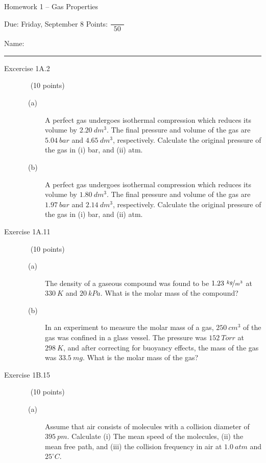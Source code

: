 \documentclass[12pt, openany, letterpaper]{memoir}
\begin{document}
\begin{center}
	{\large Homework 1 -- Gas Properties}
	
	Due: Friday, September 8 \hspace{3em} Points: ${\dfrac{~}{~~50~~}}$
\end{center}

Name: \rule[-.1mm]{15em}{0.1pt}

\begin{description}
	\item [Excercise 1A.2] ~ (10 points)
	\begin{description}
		\item [~(a)~~] A perfect gas undergoes isothermal compression which reduces its volume by $2.20~dm^3$. The final pressure and volume of the gas are $5.04~bar$ and $4.65~dm^3$, respectively. Calculate the original pressure of the gas in (i) bar, and (ii) atm.
		
		\vspace{6em}
		\item [~(b)~~] A perfect gas undergoes isothermal compression which reduces its volume by $1.80~dm^3$. The final pressure and volume of the gas are $1.97~bar$ and $2.14~dm^3$, respectively. Calculate the original pressure of the gas in (i) bar, and (ii) atm.
				
		\vspace{6em}
	\end{description} 
	\item [Exercise 1A.11] ~ (10 points)
	\begin{description}
		\item [~(a)~~] The density of a gaseous compound was found to be $1.23~\nicefrac{kg}{m^3}$ at $330~K$ and $20~kPa$. What is the molar mass of the compound?
		
		\vspace{9em}
		\item [~(b)~~] In an experiment to measure the molar mass of a gas, $250~cm^3$ of the gas was confined in a glass vessel. The pressure was $152~Torr$ at $298~K$, and after correcting for buoyancy effects, the mass of the gas was $33.5~mg$. What is the molar mass of the gas?
				
		\vspace{9em}
	\end{description} 
	\item [Exercise 1B.15] ~ (10 points)
	\begin{description}
		\item [~(a)~~] Assume that air consists of  molecules with a collision diameter of $395~pm$. Calculate (i) The mean speed of the molecules, (ii) the mean free path, and (iii) the collision frequency in air at $1.0~atm$ and $25^\circ C$.
		

\end{description}
\end{description}
\end{document}
